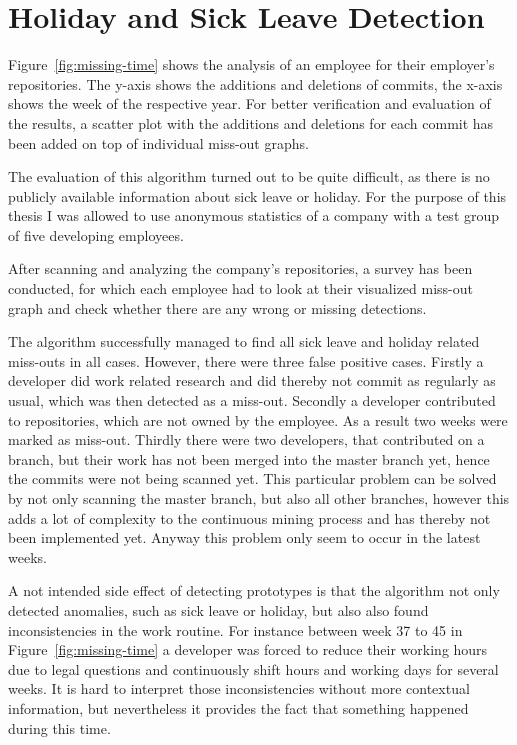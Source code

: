 \section{Holiday and Sick Leave Detection}

Figure~\ref{fig:missing-time} shows the analysis of an employee for their employer's repositories.
The y-axis shows the additions and deletions of commits, the x-axis shows the week of the respective year.
For better verification and evaluation of the results, a scatter plot with the additions and deletions for each commit has been added on top of individual miss-out graphs.

The evaluation of this algorithm turned out to be quite difficult, as there is no publicly available information about sick leave or holiday.
For the purpose of this thesis I was allowed to use anonymous statistics of a company with a test group of five developing employees.

After scanning and analyzing the company's repositories, a survey has been conducted, for which each employee had to look at their visualized miss-out graph and check whether there are any wrong or missing detections.

The algorithm successfully managed to find all sick leave and holiday related miss-outs in all cases.
However, there were three false positive cases.
Firstly a developer did work related research and did thereby not commit as regularly as usual, which was then detected as a miss-out.
Secondly a developer contributed to repositories, which are not owned by the employee.
As a result two weeks were marked as miss-out.
Thirdly there were two developers, that contributed on a branch, but their work has not been merged into the master branch yet, hence the commits were not being scanned yet.
This particular problem can be solved by not only scanning the master branch, but also all other branches, however this adds a lot of complexity to the continuous mining process and has thereby not been implemented yet.
Anyway this problem only seem to occur in the latest weeks.

A not intended side effect of detecting prototypes is that the algorithm not only detected anomalies, such as sick leave or holiday, but also also found inconsistencies in the work routine.
For instance between week 37 to 45 in Figure~\ref{fig:missing-time} a developer was forced to reduce their working hours due to legal questions and continuously shift hours and working days for several weeks.
It is hard to interpret those inconsistencies without more contextual information, but nevertheless it provides the fact that something happened during this time.


